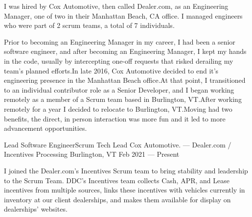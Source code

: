 

\begin{cvparagraph}
I was hired by Cox Automotive, then called Dealer.com, as an
Engineering Manager, one of two in their Manhattan Beach, CA office.
I managed engineers who were part of 2 scrum teams, a total of 7
individuals.
\end{cvparagraph}


\begin{cvparagraph}
Prior to becoming an Engineering Manager in my career, I had been a
senior software engineer, and after becoming an Engineering Manager, I kept my
hands in the code, usually by intercepting one-off requests that
risked derailing my team's planned efforts.\@ In late 2016, Cox
Automotive decided to end it's engineering presence in the Manhattan
Beach office.\@ At that point, I transitioned to an individual contributor role as a
Senior Developer, and I began working remotely as a member of a Scrum team based
in Burlington, VT.\@ After working remotely for a year I decided to
relocate to Burlington, VT.\@ Moving had two benefits, the direct, in
person interaction was more fun and it led to more advancement opportunities.
\end{cvparagraph}


\begin{cventries}
  \cventry
    {Lead Software Engineer{\enskip\cdotp\enskip}Scrum Tech Lead} %
    {Cox Automotive. --- Dealer.com / Incentives Processing} %
    {Burlington, VT} %
    {Feb 2021 --- Present} %
    {}
\end{cventries}
\vspace{-6.00mm}

\begin{cvparagraph}
I joined the Dealer.com's Incentives Scrum team to bring stability and leadership to the Scrum Team.
DDC's Incentives team collects Cash, APR, and Lease incentives from multiple sources,
links these incentives with vehicles currently in inventory at our client dealerships,
and makes them available for display on dealerships' websites.
\end{cvparagraph}


